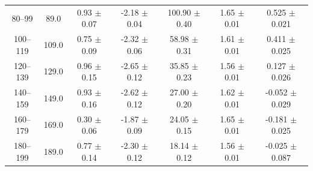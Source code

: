 \begin{table}[htbp]
\begin{tabular}{c c c c c c c}
80--99 & 89.0 & 0.93 $\pm$ 0.07 & -2.18 $\pm$ 0.04 & 100.90 $\pm$ 0.40 & 1.65 $\pm$ 0.01 & 0.525 $\pm$ 0.021 \\
100--119 & 109.0 & 0.75 $\pm$ 0.09 & -2.32 $\pm$ 0.06 & 58.98 $\pm$ 0.31 & 1.61 $\pm$ 0.01 & 0.411 $\pm$ 0.025 \\
120--139 & 129.0 & 0.96 $\pm$ 0.15 & -2.65 $\pm$ 0.12 & 35.85 $\pm$ 0.23 & 1.56 $\pm$ 0.01 & 0.127 $\pm$ 0.026 \\
140--159 & 149.0 & 0.93 $\pm$ 0.16 & -2.62 $\pm$ 0.12 & 27.00 $\pm$ 0.20 & 1.62 $\pm$ 0.01 & -0.052 $\pm$ 0.029 \\
160--179 & 169.0 & 0.30 $\pm$ 0.06 & -1.87 $\pm$ 0.09 & 24.05 $\pm$ 0.15 & 1.65 $\pm$ 0.01 & -0.181 $\pm$ 0.025 \\
180--199 & 189.0 & 0.77 $\pm$ 0.14 & -2.30 $\pm$ 0.12 & 18.14 $\pm$ 0.12 & 1.56 $\pm$ 0.01 & -0.025 $\pm$ 0.087 \\
\hline\hline
\end{tabular}
\end{table}